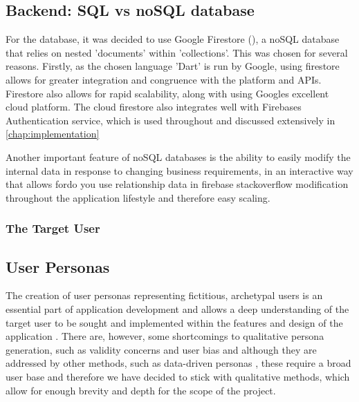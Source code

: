 \documentclass[12pt]{article}
\begin{document}
	\subsection{Backend: SQL vs noSQL database}
	For the database, it was decided to use Google Firestore (\cite{firestore}), a noSQL database that relies on  nested 'documents' within 'collections'. This was chosen for several reasons. Firstly, as the chosen language 'Dart' is run by Google, using firestore allows for greater integration and congruence with the platform and APIs. Firestore also allows for rapid scalability, along with using Googles excellent cloud platform. The cloud firestore also integrates well with Firebases Authentication service, which is used throughout and discussed extensively in \autoref{chap:implementation}
	
	Another important feature of noSQL databases is the ability to easily modify the internal data in response to changing business requirements, in an interactive way that allows fordo you use relationship data in firebase stackoverflow modification throughout the application lifestyle and therefore easy scaling.
	
	

	
	
	\subsubsection{The Target User}
	

	
	
	\subsection{User Personas}
	\label{user-personas}
	The creation of user personas representing fictitious, archetypal users is an essential part of application development \cite{Grudin and Pruitt, 2002} and allows a deep understanding of the target user to be sought and implemented within the features and design of the application \cite{Long, 2009}. There are, however, some shortcomings to qualitative persona generation, such as validity concerns and user bias \cite{Chapman and Milham, 2007} and although they are addressed by other methods, such as data-driven personas \cite{Mcginn and Kotamraju, 2008}, these require a broad user base and therefore we have decided to stick with qualitative methods, which allow for enough brevity and depth for the scope of the project.
	
\end{document}
